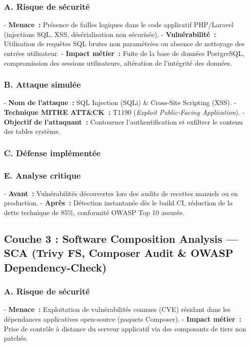 \subsubsection{A. Risque de sécurité}
- \textbf{Menace~:} Présence de failles logiques dans le code applicatif PHP/Laravel (injections SQL, XSS, désérialisation non sécurisée).
- \textbf{Vulnérabilité~:} Utilisation de requêtes SQL brutes non paramétrées ou absence de nettoyage des entrées utilisateur.
- \textbf{Impact métier~:} Fuite de la base de données PostgreSQL, compromission des sessions utilisateurs, altération de l'intégrité des données.

\subsubsection{B. Attaque simulée}
- \textbf{Nom de l'attaque~:} SQL Injection (SQLi) \& Cross-Site Scripting (XSS).
- \textbf{Technique MITRE ATT\&CK~:} T1190 (\textit{Exploit Public-Facing Application}).
- \textbf{Objectif de l'attaquant~:} Contourner l'authentification et exfiltrer le contenu des tables système.

\subsubsection{C. Défense implémentée}

\vspace{0.3cm}
\subsubsection{E. Analyse critique}
- \textbf{Avant~:} Vulnérabilités découvertes lors des audits de recettes manuels ou en production.
- \textbf{Après~:} Détection instantanée dès le build CI, réduction de la dette technique de 85\%, conformité OWASP Top 10 assurée.

\subsection{Couche 3 : Software Composition Analysis — SCA (Trivy FS, Composer Audit \& OWASP Dependency-Check)}
\subsubsection{A. Risque de sécurité}
- \textbf{Menace~:} Exploitation de vulnérabilités connues (CVE) résidant dans les dépendances applicatives open-source (paquets Composer).
- \textbf{Impact métier~:} Prise de contrôle à distance du serveur applicatif via des composants de tiers non patchés.

